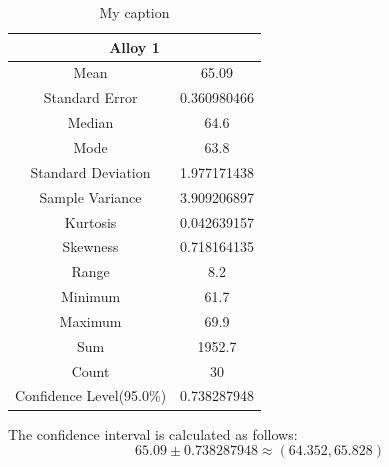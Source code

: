 \documentclass[letterpaper]{article}
\begin{document}
\begin{table}[H]
 \centering
 \begin{tabular}{|c|c|}
  \hline
  \multicolumn{2}{|c|}{Alloy 1}          \\ \hline
  Mean                     & 65.09       \\ \hline
  Standard Error           & 0.360980466 \\ \hline
  Median                   & 64.6        \\ \hline
  Mode                     & 63.8        \\ \hline
  Standard Deviation       & 1.977171438 \\ \hline
  Sample Variance          & 3.909206897 \\ \hline
  Kurtosis                 & 0.042639157 \\ \hline
  Skewness                 & 0.718164135 \\ \hline
  Range                    & 8.2         \\ \hline
  Minimum                  & 61.7        \\ \hline
  Maximum                  & 69.9        \\ \hline
  Sum                      & 1952.7      \\ \hline
  Count                    & 30          \\ \hline
  Confidence Level(95.0\%) & 0.738287948 \\ \hline
 \end{tabular}
 \caption{My caption}
 \label{3a1}
\end{table}

The confidence interval is calculated as follows:
$$65.09 \pm 0.738287948 \approx (64.352, 65.828)$$
\end{document}
